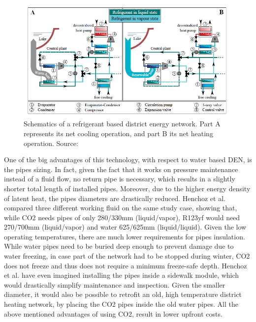 \documentclass{article}
\begin{document}

\begin{figure}[h!]
\centering
\includegraphics[width=1\textwidth]{CO2schema.JPG}
\caption{Schematics of a refrigerant based district energy network. Part A represents its net cooling operation, and part B its net heating operation. Source:~\cite{henchozPotentialRefrigerantBased2016}}
\label{fig:CO2schema}
\end{figure}

One of the big advantages of this technology, with respect to water based DEN, is the pipes sizing. In fact, given the fact that it works on pressure maintenance instead of a fluid flow, no return pipe is necessary, which results in a slightly shorter total length of installed pipes. Moreover, due to the higher energy density of latent heat, the pipes diameters are drastically reduced. Henchoz et al.~\cite{henchozPotentialRefrigerantBased2016} compared three different working fluid on the same study case, showing that, while CO2 needs pipes of only 280/330mm (liquid/vapor), R123yf would need 270/700mm (liquid/vapor) and water 625/625mm (liquid/liquid). Given the low operating temperatures, there are much lower requirements for pipes insulation. While water pipes need to be buried deep enough to prevent damage due to water freezing, in case part of the network had to be stopped during winter, CO2 does not freeze and thus does not require a minimum freeze-safe depth. Henchoz et al. have even imagined installing the pipes inside a sidewalk module, which would drastically simplify maintenance and inspection. Given the smaller diameter, it would also be possible to retrofit an old, high temperature district heating network, by placing the CO2 pipes inside the old water pipes. All the above mentioned advantages of using CO2, result in lower upfront costs. \\
\end{document}
